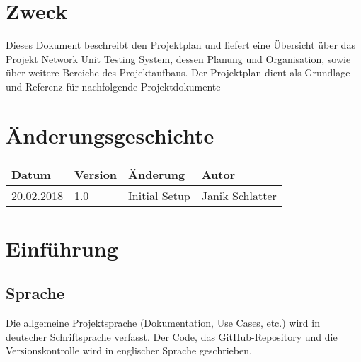 \documentclass[
	ngerman,
	toc=listof, %
	toc=bibliography, %
	footnotes=multiple, %
	parskip=half, %
	numbers=noendperiod %
]{scrartcl}
\newcommand{\vorlagenOrdner}{../../99_Vorlagen} %
\begin{document}
\thispagestyle{plain}

\cleardoublepage


\section*{Zweck}
Dieses Dokument beschreibt den Projektplan und liefert eine Übersicht über das Projekt Network Unit Testing System, dessen Planung und Organisation, sowie über weitere Bereiche des Projektaufbaus. Der Projektplan dient als Grundlage und Referenz für nachfolgende Projektdokumente

\section*{Änderungsgeschichte}
\begin{tabularx}{0.9\textwidth}{llXl}
	\toprule
	Datum & Version & Änderung & Autor \\
	\midrule
	20.02.2018 & 1.0 & Initial Setup & Janik Schlatter \\
	\bottomrule
\end{tabularx}
\cleardoublepage

{}
\tableofcontents
\cleardoublepage

\let\stdsection\section
\renewcommand\section{\clearpage\stdsection}

\section{Einführung}

	\subsection{Sprache}
		Die allgemeine Projektsprache (Dokumentation, Use Cases, etc.) wird in deutscher Schriftsprache verfasst.
		Der Code, das GitHub-Repository und die Versionskontrolle wird in englischer Sprache geschrieben.
\end{document}
